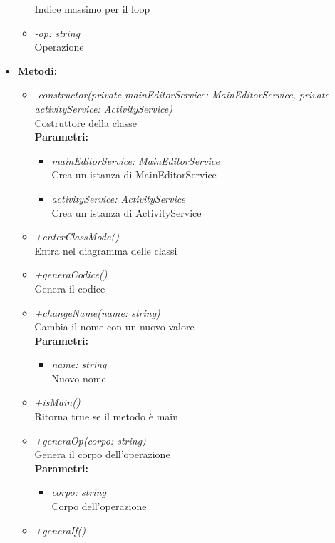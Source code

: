 \begin{itemize}
\begin{itemize}
			Indice massimo per il loop
			\item \emph{-op: string}\\
			Operazione
		\end{itemize}
	\item \textbf{Metodi:}
		\begin{itemize}
			\item \emph{-constructor(private mainEditorService: MainEditorService,
		private activityService: ActivityService)}\\
    		Costruttore della classe\\
    		\textbf{Parametri:}
    		\begin{itemize}
    			\item \emph{mainEditorService: MainEditorService}\\
    			Crea un istanza di MainEditorService
    			\item \emph{activityService: ActivityService}\\
    			Crea un istanza di ActivityService
    		\end{itemize}
    		\item \emph{+enterClassMode()}\\
    		Entra nel diagramma delle classi
    		\item \emph{+generaCodice()}\\
    		Genera il codice
    		\item \emph{+changeName(name: string)}\\
    		Cambia il nome con un nuovo valore\\
    		\textbf{Parametri:}
    		\begin{itemize}
    			\item \emph{name: string}\\
    			Nuovo nome
    		\end{itemize}
    		\item \emph{+isMain()}\\
    		Ritorna true se il metodo è main
    		\item \emph{+generaOp(corpo: string)}\\
    		Genera il corpo dell'operazione\\
    		\textbf{Parametri:}
    		\begin{itemize}
    			\item \emph{corpo: string}\\
    			Corpo dell'operazione
    		\end{itemize}
    		\item \emph{+generaIf()}\\

\end{itemize}
\end{itemize}
